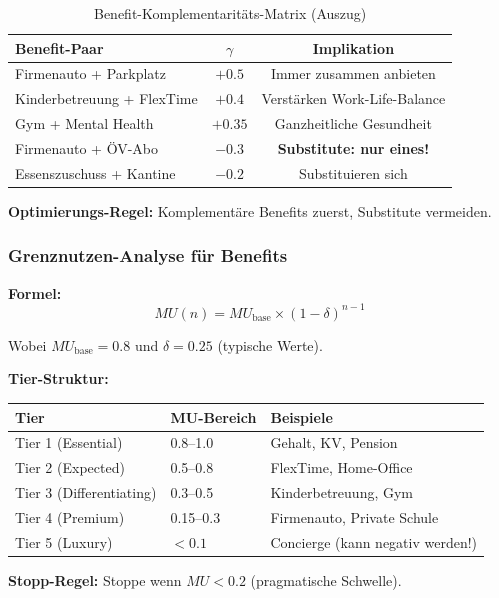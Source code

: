 \begin{table}[htbp]
\centering
\caption{Benefit-Komplementaritäts-Matrix (Auszug)}
\label{tab:20-benefit-gamma}
\renewcommand{\arraystretch}{1.2}
\small
\begin{tabular}{@{}lcc@{}}
\toprule
\textbf{Benefit-Paar} & \textbf{$\gamma$} & \textbf{Implikation} \\
\midrule
Firmenauto + Parkplatz & $+0.5$ & Immer zusammen anbieten \\
Kinderbetreuung + FlexTime & $+0.4$ & Verstärken Work-Life-Balance \\
Gym + Mental Health & $+0.35$ & Ganzheitliche Gesundheit \\
\midrule
Firmenauto + ÖV-Abo & $-0.3$ & \textbf{Substitute: nur eines!} \\
Essenszuschuss + Kantine & $-0.2$ & Substituieren sich \\
\bottomrule
\end{tabular}
\end{table}

\textbf{Optimierungs-Regel:} Komplementäre Benefits zuerst, Substitute vermeiden.

\subsubsection{Grenznutzen-Analyse für Benefits}

\begin{tcolorbox}[colback=yellow!5!white, colframe=yellow!75!black,
    title=Diminishing Returns bei Benefits]

\textbf{Formel:}
\begin{equation}
MU(n) = MU_{\text{base}} \times (1 - \delta)^{n-1}
\end{equation}

Wobei $MU_{\text{base}} = 0.8$ und $\delta = 0.25$ (typische Werte).

\textbf{Tier-Struktur:}
\begin{center}
\begin{tabular}{@{}lll@{}}
\toprule
\textbf{Tier} & \textbf{MU-Bereich} & \textbf{Beispiele} \\
\midrule
Tier 1 (Essential) & 0.8--1.0 & Gehalt, KV, Pension \\
Tier 2 (Expected) & 0.5--0.8 & FlexTime, Home-Office \\
Tier 3 (Differentiating) & 0.3--0.5 & Kinderbetreuung, Gym \\
Tier 4 (Premium) & 0.15--0.3 & Firmenauto, Private Schule \\
Tier 5 (Luxury) & $<0.1$ & Concierge (kann negativ werden!) \\
\bottomrule
\end{tabular}
\end{center}

\textbf{Stopp-Regel:} Stoppe wenn $MU < 0.2$ (pragmatische Schwelle).
\end{tcolorbox}

